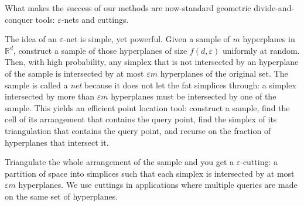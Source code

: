 What makes the success of our methods are now-standard geometric
divide-and-conquer tools: \(\varepsilon\)-nets and cuttings.

The idea of an \(\varepsilon\)-net is simple, yet powerful. Given a sample of
\(m\) hyperplanes in \(\mathbb{R}^d\), construct a sample of those hyperplanes
of size \(f(d, \varepsilon)\) uniformly at random. Then, with high probability,
any simplex that is not intersected by an hyperplane of the sample is intersected
by at most \(\varepsilon m\) hyperplanes of the original set. The sample is
called a \emph{net} because it does not let the fat simplices through: a
simplex intersected by more than \(\varepsilon m\) hyperplanes must be intersected
by one of the sample.
%
This yields an efficient point location tool: construct a sample, find the cell
of its arrangement that contains the query point, find the simplex of its
triangulation that contains the query point, and recurse on the fraction of
hyperplanes that intersect it.

Triangulate the whole arrangement of the sample and you get a
\(\varepsilon\)-cutting: a partition of space into simplices such
that each simplex is intersected by at most \(\varepsilon m\) hyperplanes.
We use cuttings in applications where multiple queries are made on the same set
of hyperplanes.
